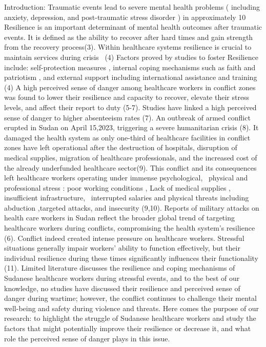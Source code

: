 Introduction: 
Traumatic events lead to severe mental health problems ( including anxiety, depression, and post-traumatic stress disorder ) in approximately 10%
Resilience is an important determinant of mental health outcomes after traumatic events. It is defined as the ability to recover after hard times and gain strength from the recovery process(3). Within healthcare systems resilience is crucial to maintain services during crisis  (4) Factors proved by studies to foster Resilience include: self-protection measures , internal coping mechanisms such as faith and patriotism , and external support including international assistance and training (4) 
A high perceived sense of danger among healthcare workers in conflict zones was found to lower their resilience and capacity to recover, elevate their stress levels, and affect their report to duty (5-7). Studies have linked a high perceived sense of danger to higher absenteeism rates (7). 
An outbreak of armed conflict erupted in Sudan on April 15,2023, triggering a severe humanitarian crisis (8). It damaged the health system as only one-third of healthcare facilities in conflict zones have left operational after the destruction of hospitals, disruption of medical supplies, migration of healthcare professionals, and the increased cost of the already underfunded healthcare sector(9).
 This conflict and its consequences left healthcare workers operating under immense psychological,  physical and professional stress : poor working conditions , Lack of medical supplies , insufficient infrastructure,  interrupted salaries and physical threats including abduction ,targeted attacks, and insecurity (9,10). Reports of military attacks on health care workers in Sudan reflect the broader global trend of targeting healthcare workers during conflicts, compromising the health system’s resilience (6). 
Conflict indeed created intense pressure on healthcare workers. Stressful situations generally impair workers’ ability to function effectively, but their individual resilience during these times significantly influences their functionality (11). Limited literature discusses the resilience and coping mechanisms of Sudanese healthcare workers during stressful events, and to the best of our knowledge, no studies have discussed their resilience and perceived sense of danger during wartime; however, the conflict continues to challenge their mental well-being and safety during violence and threats. Here comes the purpose of our research: to highlight the struggle of Sudanese healthcare workers and study the factors that might potentially improve their resilience or decrease it, and what role the perceived sense of danger plays in this issue.

